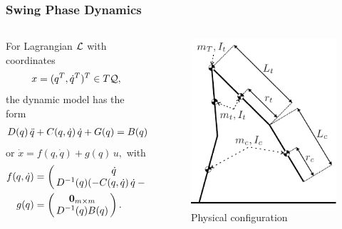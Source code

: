 \documentclass{beamer}
\begin{document}
\begin{frame}
  \frametitle{Swing Phase Dynamics}
  \begin{columns}
    \begin{column}{.55\textwidth}
      For Lagrangian $\mathcal{L}$ with coordinates
      \begin{align*}
        x = (q^{T}, \dot q^{T})^{T} \in T\mathcal{Q},
      \end{align*}
      the dynamic model has the form
      \begin{align*}
        D(q) \, \ddot q + C(q, \dot q) \, \dot q + G(q) = B(q) \, u,
      \end{align*}
      or $\dot x = f(q, \dot q) + g(q) \, u,$ with
      \begin{align*}
        f(\q, \dq) &= \left(\!\!\begin{array}{c}
        \dq\\
        \D^{-1}(\q) (-\C(\q, \dq) \, \dq - \G(\q))
        \end{array}\!\!\right),\\
        g(\q) &= \left(\!\!\begin{array}{c}
        \mathbf{0}_{m \times m}\\
        \D^{-1}(\q) B(\q)
        \end{array}\!\!\right).
      \end{align*}
    \end{column}\!\!
    \begin{column}{.45\textwidth}
      \begin{figure}
        \centering
        \vspace{-10mm}
        \caption{Physical configuration}
        \includegraphics[width = 1.0\columnwidth]{robot_config}

\end{figure}
\end{column}
\end{columns}
\end{frame}
\end{document}
